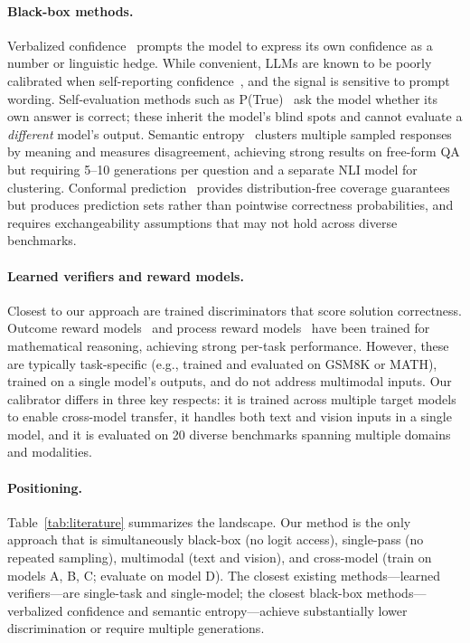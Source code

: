\documentclass{colm2026}
\begin{document}
\paragraph{Black-box methods.}
Verbalized confidence~\citep{tian2023just,lin2022teaching} prompts the model to express its own confidence as a number or linguistic hedge. While convenient, LLMs are known to be poorly calibrated when self-reporting confidence~\citep{kadavath2022language}, and the signal is sensitive to prompt wording. Self-evaluation methods such as P(True)~\citep{kadavath2022language} ask the model whether its own answer is correct; these inherit the model's blind spots and cannot evaluate a \emph{different} model's output. Semantic entropy~\citep{kuhn2023semantic} clusters multiple sampled responses by meaning and measures disagreement, achieving strong results on free-form QA but requiring 5--10 generations per question and a separate NLI model for clustering. Conformal prediction~\citep{angelopoulos2023conformal} provides distribution-free coverage guarantees but produces prediction sets rather than pointwise correctness probabilities, and requires exchangeability assumptions that may not hold across diverse benchmarks.

\paragraph{Learned verifiers and reward models.}
Closest to our approach are trained discriminators that score solution correctness. Outcome reward models~\citep{cobbe2021training} and process reward models~\citep{lightman2023lets} have been trained for mathematical reasoning, achieving strong per-task performance. However, these are typically task-specific (e.g., trained and evaluated on GSM8K or MATH), trained on a single model's outputs, and do not address multimodal inputs. Our calibrator differs in three key respects: it is trained across multiple target models to enable cross-model transfer, it handles both text and vision inputs in a single model, and it is evaluated on 20 diverse benchmarks spanning multiple domains and modalities.

\paragraph{Positioning.}
Table~\ref{tab:literature} summarizes the landscape. Our method is the only approach that is simultaneously black-box (no logit access), single-pass (no repeated sampling), multimodal (text and vision), and cross-model (train on models A, B, C; evaluate on model D). The closest existing methods---learned verifiers---are single-task and single-model; the closest black-box methods---verbalized confidence and semantic entropy---achieve substantially lower discrimination or require multiple generations.
\end{document}
